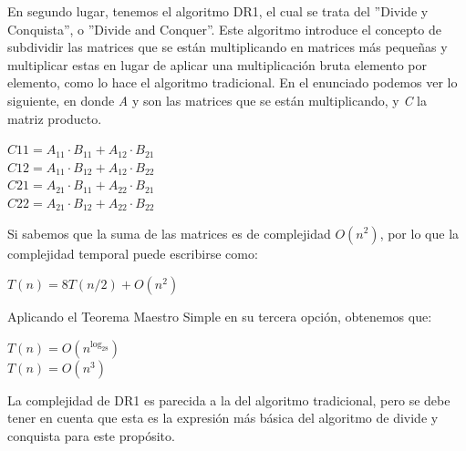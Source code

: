 \documentclass[12pt]{report}
\begin{document}
  En segundo lugar, tenemos el algoritmo DR1, el cual se trata del ''Divide y Conquista'', o ''Divide and Conquer''. Este algoritmo introduce el concepto de subdividir las matrices que se están multiplicando en matrices más pequeñas y multiplicar estas en lugar de aplicar una multiplicación bruta elemento por elemento, como lo hace el algoritmo tradicional. En el enunciado podemos ver lo siguiente, en donde \textit{A} y  son las matrices que se están multiplicando, y \textit{C} la matriz producto.
  
  \begin{center}
    $ C11 = A_{11} \cdot B_{11} + A_{12} \cdot B_{21} $\\
    $ C12 = A_{11} \cdot B_{12} + A_{12} \cdot B_{22}$\\
    $ C21 = A_{21} \cdot B_{11} + A_{22} \cdot B_{21} $\\
    $ C22 = A_{21} \cdot B_{12} + A_{22} \cdot B_{22} $\\
  \end{center}
  
  Si sabemos que la suma de las matrices es de complejidad $O(n^2)$, por lo que la complejidad temporal puede escribirse como:
  
  \begin{center}
    $ T(n) = 8T(n/2) + O(n^2) $
  \end{center}
  
  Aplicando el Teorema Maestro Simple en su tercera opción, obtenemos que:
  
  \begin{center}
    $T(n) = O(n^{\log_28})$ \\
    $T(n) = O(n^3)$
  \end{center}
  
  La complejidad de DR1 es parecida a la del algoritmo tradicional, pero se debe tener en cuenta que esta es la expresión más básica del algoritmo de divide y conquista para este propósito.
  
  \begin{center}
  \end{center}
    
\end{document}

